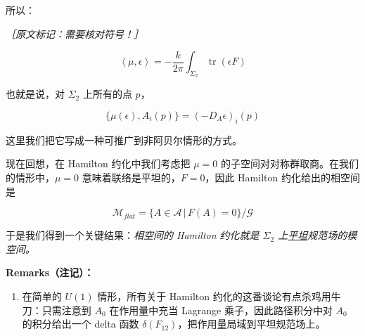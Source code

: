 所以：

{\small\itshape ［原文标记：需要核对符号！］}%

\begin{equation}
  \left\langle\mu,\epsilon\right\rangle=-\frac{k}{2\pi}\int_{\Sigma_2}\operatorname{tr}\left(\epsilon F\right)
  \tag{2.91}
  \label{eq:2.91}
\end{equation}

也就是说，对 $\Sigma_2$ 上所有的点 $p$，

\begin{equation}
  \{\mu(\epsilon),A_i(p)\}=(-D_A\epsilon)_i(p)
  \tag{2.92}
  \label{eq:2.92}
\end{equation}

这里我们把它写成一种可推广到非阿贝尔情形的方式。


现在回想，在 Hamilton 约化中我们考虑把 $\mu=0$ 的子空间对对称群取商。在我们的情形中，$\mu=0$ 意味着联络是平坦的，$F=0$，因此 Hamilton 约化给出的相空间是

\begin{equation}
  \mathcal{M}_{flat}=\{A\in\mathcal{A}\,|\,F(A)=0\}/\mathcal{G}
  \tag{2.93}
  \label{eq:2.93}
\end{equation}

于是我们得到一个关键结果：\emph{相空间的 Hamilton 约化就是 $\Sigma_2$ 上\underline{平坦}规范场的模空间。}

\textbf{Remarks（注记）：}

\begin{enumerate}
  \item 在简单的 $U(1)$ 情形，所有关于 Hamilton 约化的这番谈论有点杀鸡用牛刀：只需注意到 $A_0$ 在作用量中充当 Lagrange 乘子，因此路径积分中对 $A_0$ 的积分给出一个 delta 函数 $\delta(F_{12})$，把作用量局域到平坦规范场上。
\end{enumerate}
